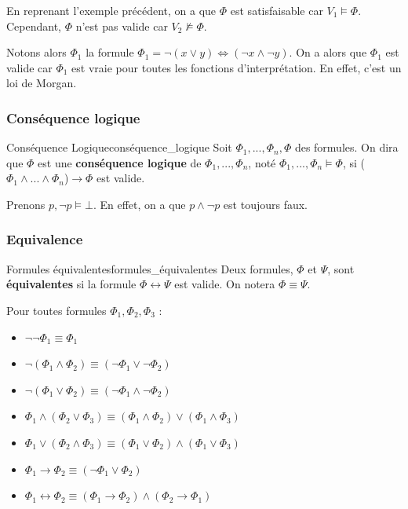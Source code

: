 \begin{example}\leavevmode
  En reprenant l'exemple précédent, on a que $\Phi$ est satisfaisable car $V_1\vDash\Phi$. Cependant, $\Phi$ n'est pas valide car $V_2\nvDash\Phi$.

  Notons alors $\Phi_1$ la formule $\Phi_1 = \neg(x\vee y) \iff (\neg x \wedge \neg y)$.
  On a alors que $\Phi_1$ est valide car $\Phi_1$ est vraie pour toutes les fonctions d'interprétation. 
  En effet, c'est un loi de Morgan.
\end{example}

\subsubsection{Conséquence logique}
\begin{definition}{Conséquence Logique}{conséquence_logique}
Soit $\Phi_1,...,\Phi_n,\Phi$ des formules. On dira que $\Phi$ est une \textbf{conséquence logique} de $\Phi_1,...,\Phi_n$, noté $\Phi_1,...,\Phi_n\vDash\Phi$, si ($\Phi_1\land ...\land\Phi_n$)$\rightarrow\Phi$ est valide.
\end{definition}

\begin{example}\leavevmode
  Prenons $p, \neg p \vDash \bot$. En effet, on a que $p\land\neg p$ est toujours faux.

\end{example}

\subsubsection{Equivalence}

\begin{definition}{Formules équivalentes}{formules_équivalentes}
Deux formules, $\Phi$ et $\Psi$, sont \textbf{équivalentes} si la formule $\Phi\leftrightarrow\Psi$ est valide. On notera $\Phi\equiv\Psi$.
\end{definition}
Pour toutes formules $\Phi_1,\Phi_2,\Phi_3$ :
\begin{itemize}[label=$\bullet$]
  \item $\neg\neg\Phi_1\equiv\Phi_1$
  \item $\neg(\Phi_1\land\Phi_2)\equiv(\neg\Phi_1\lor\neg\Phi_2)$
  \item $\neg(\Phi_1\lor\Phi_2)\equiv(\neg\Phi_1\land\neg\Phi_2)$
  \item $\Phi_1\land(\Phi_2\lor\Phi_3)\equiv(\Phi_1\land\Phi_2)\lor(\Phi_1\land\Phi_3)$
  \item $\Phi_1\lor(\Phi_2\land\Phi_3)\equiv(\Phi_1\lor\Phi_2)\land(\Phi_1\lor\Phi_3)$
  \item $\Phi_1\rightarrow\Phi_2\equiv(\neg\Phi_1\lor\Phi_2)$
  \item $\Phi_1\leftrightarrow\Phi_2\equiv(\Phi_1\rightarrow\Phi_2)\land(\Phi_2\rightarrow\Phi_1)$
\end{itemize}

